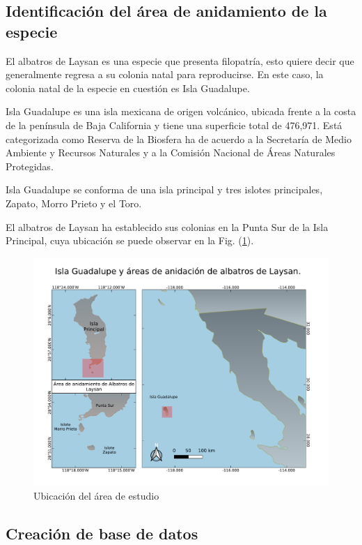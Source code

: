 \subsection{Identificación del área de anidamiento de la especie}

El albatros de Laysan es una especie que presenta filopatría, esto quiere decir
que generalmente regresa a su colonia natal para reproducirse. En este caso, la
colonia natal de la especie en cuestión es Isla Guadalupe.

Isla Guadalupe es una isla mexicana de origen volcánico, ubicada frente a la
costa de la península de Baja California y tiene una superficie total de
476,971. Está categorizada como Reserva de la Biosfera ha de acuerdo a la
Secretaría de Medio Ambiente y Recursos Naturales y a la Comisión Nacional de
Áreas Naturales Protegidas.

Isla Guadalupe se conforma de una isla principal y tres islotes principales,
Zapato, Morro Prieto y el Toro.

El albatros de Laysan ha establecido sus colonias en la Punta Sur de la Isla
Principal, cuya ubicación se puede observar en la Fig.
(\ref{fig:ubicacionIslaGpe}).

\begin{figure}[h]
    \centering
    \includegraphics[scale=0.60]{figures/Isla Guadalupe.pdf}
    \caption{Ubicación del área de estudio}
    \label{fig:ubicacionIslaGpe}
\end{figure}

\subsection{Creación de base de datos}

